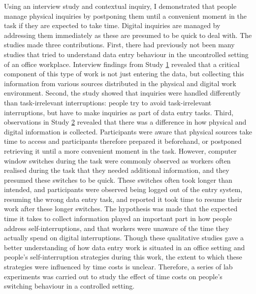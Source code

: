 Using an interview study and contextual inquiry, I demonstrated that people manage physical inquiries by postponing them until a convenient moment in the task if they are expected to take time. Digital inquiries are managed by addressing them immediately as these are presumed to be quick to deal with.
The studies made three contributions. First, there had previously not been many studies that tried to understand data entry behaviour in the uncontrolled setting of an office workplace. Interview findings from Study \hyperref[st:Study1]{1} revealed that a critical component of this type of work is not just entering the data, but collecting this information from various sources distributed in the physical and digital work environment. Second, the study showed that inquiries were handled differently than task-irrelevant interruptions: people try to avoid task-irrelevant interruptions, but have to make inquiries as part of data entry tasks. Third, observations in Study \hyperref[st:Study2]{2} revealed that there was a difference in how physical and digital information is collected. Participants were aware that physical sources take time to access and participants therefore prepared it beforehand, or postponed retrieving it until a more convenient moment in the task. However, computer window switches during the task were commonly observed as workers often realised during the task that they needed additional information, and they presumed these switches to be quick. These switches often took longer than intended, and participants were observed being logged out of the entry system, resuming the wrong data entry task, and reported it took time to resume their work after these longer switches. The hypothesis was made that the expected time it takes to collect information played an important part in how people address self-interruptions, and that workers were unaware of the time they actually spend on digital interruptions. Though these qualitative studies gave a better understanding of how data entry work is situated in an office setting and people's self-interruption strategies during this work, the extent to which these strategies were influenced by time costs is unclear. Therefore, a series of lab experiments was carried out to study the effect of time costs on people's switching behaviour in a controlled setting.

